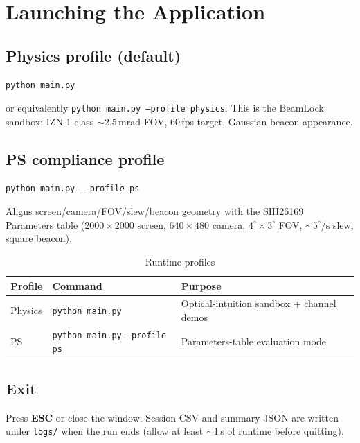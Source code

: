 \documentclass[11pt,a4paper]{article}
\begin{document}
\section{Launching the Application}

\subsection{Physics profile (default)}
\begin{lstlisting}
python main.py
\end{lstlisting}
or equivalently \texttt{python main.py --profile physics}.
This is the BeamLock sandbox: IZN-1 class $\sim$2.5\,mrad FOV, 60\,fps target, Gaussian beacon appearance.

\subsection{PS compliance profile}
\begin{lstlisting}
python main.py --profile ps
\end{lstlisting}
Aligns screen/camera/FOV/slew/beacon geometry with the SIH26169 Parameters table ($2000\times2000$ screen, $640\times480$ camera, $4^\circ\times3^\circ$ FOV, $\sim5^\circ/\mathrm{s}$ slew, square beacon).

\begin{table}[H]
\centering
\caption{Runtime profiles}
\label{tab:profiles}
\small
\begin{tabular}{@{}lll@{}}
\toprule
\textbf{Profile} & \textbf{Command} & \textbf{Purpose} \\
\midrule
Physics & \texttt{python main.py} & Optical-intuition sandbox + channel demos \\
PS & \texttt{python main.py --profile ps} & Parameters-table evaluation mode \\
\bottomrule
\end{tabular}
\end{table}

\subsection{Exit}
Press \textbf{ESC} or close the window.
Session CSV and summary JSON are written under \texttt{logs/} when the run ends (allow at least $\sim$1\,s of runtime before quitting).

\end{document}
